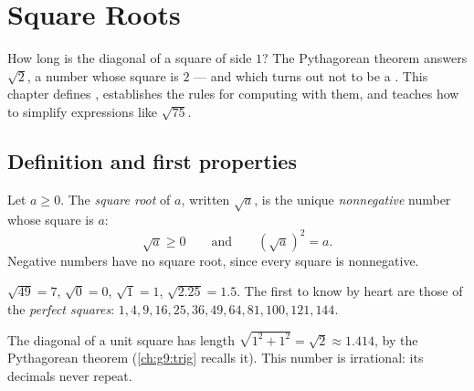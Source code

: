 \chapter{Square Roots}\label{ch:g9:sqrt}

How long is the diagonal of a square of side $1$? The Pythagorean theorem
answers $\sqrt 2$, a number whose square is $2$ --- and which turns out
not to be a . This chapter defines , establishes the
rules for computing with them, and teaches how to simplify expressions
like $\sqrt{75}$.

\section{Definition and first properties}

\begin{definition}\label{def:g9:sqrt:def}
Let $a \geq 0$. The \emph{square root} of $a$, written
$\sqrt a$, is the unique \emph{nonnegative} number whose square is $a$:
\[
\sqrt a \geq 0
\qquad\text{and}\qquad
\left(\sqrt a\right)^2 = a .
\]
Negative numbers have no square root, since every square is nonnegative.
\end{definition}

\begin{example}
$\sqrt{49} = 7$, $\sqrt 0 = 0$, $\sqrt 1 = 1$,
$\sqrt{2.25} = 1.5$. The first  to know by heart are those of
the \emph{perfect squares}: $1, 4, 9, 16, 25, 36, 49, 64, 81, 100, 121,
144$.
\end{example}

\begin{omfigure}

{\small The diagonal of a unit square has length $\sqrt{1^2 + 1^2} =
\sqrt2 \approx 1.414$, by the Pythagorean theorem
(\cref{ch:g9:trig} recalls it). This number is irrational: its decimals
never repeat.}
\end{omfigure}

